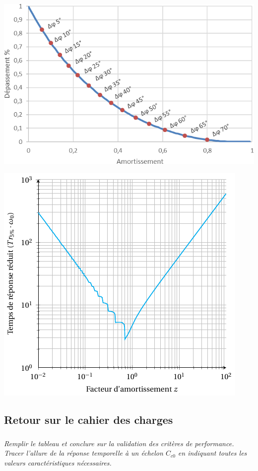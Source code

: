 \documentclass[10pt,fleqn]{article} %
\begin{document}
\begin{multicols}{2}
\begin{center}
\includegraphics[width=\linewidth]{images/abaque}
\end{center}

\begin{center}
\includegraphics[width=\linewidth]{images/abaque_tr}
\end{center}

\fi

\subsection*{Retour sur le cahier des charges}
\subparagraph{}
\textit{Remplir le tableau et conclure sur la validation des critères de performance.
Tracer l’allure de la réponse temporelle à un échelon $C_{c0}$ en indiquant toutes les valeurs caractéristiques nécessaires.}


\end{multicols}
\end{document}
